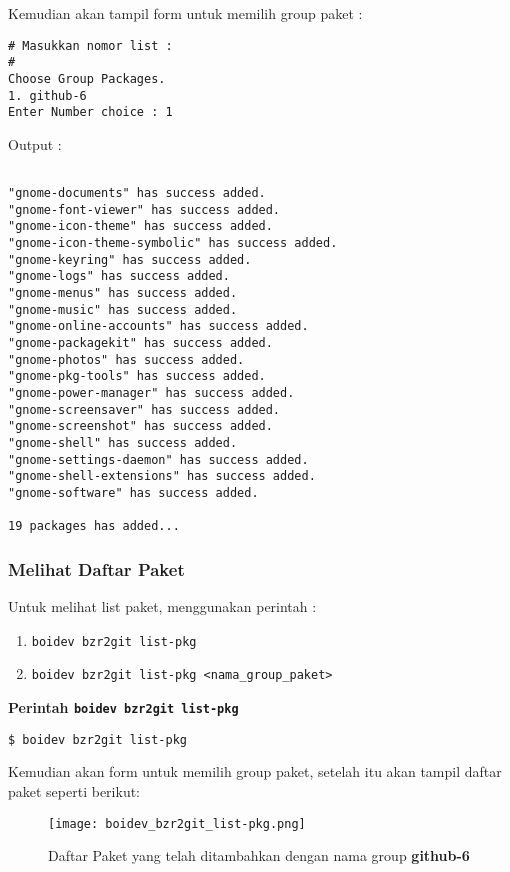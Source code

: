 {\noindent
Kemudian akan tampil form untuk memilih group paket :

\begin{lstlisting}[language=ShellBash]
# Masukkan nomor list :
#
Choose Group Packages.
1. github-6
Enter Number choice : 1
\end{lstlisting}

\noindent
Output :

\begin{lstlisting}[language=ShellBash]

"gnome-documents" has success added.
"gnome-font-viewer" has success added.
"gnome-icon-theme" has success added.
"gnome-icon-theme-symbolic" has success added.
"gnome-keyring" has success added.
"gnome-logs" has success added.
"gnome-menus" has success added.
"gnome-music" has success added.
"gnome-online-accounts" has success added.
"gnome-packagekit" has success added.
"gnome-photos" has success added.
"gnome-pkg-tools" has success added.
"gnome-power-manager" has success added.
"gnome-screensaver" has success added.
"gnome-screenshot" has success added.
"gnome-shell" has success added.
"gnome-settings-daemon" has success added.
"gnome-shell-extensions" has success added.
"gnome-software" has success added.

19 packages has added...

\end{lstlisting}

\subsubsection{Melihat Daftar Paket}
\noindent
Untuk melihat list paket, menggunakan perintah : 
\begin{enumerate}
	\item {\small \texttt{boidev bzr2git list-pkg}}
	\item {\small \texttt{boidev bzr2git list-pkg <nama\_group\_paket>}}
\end{enumerate}

\noindent
\textbf{Perintah {\small \texttt{boidev bzr2git list-pkg}}}

\begin{lstlisting}[language=ShellBash]
$ boidev bzr2git list-pkg
\end{lstlisting}

\noindent
Kemudian akan form untuk memilih group paket, setelah itu akan tampil daftar paket seperti berikut:

\begin{figure}[H]
	\centering
	\texttt{[image: boidev\_bzr2git\_list-pkg.png]}
	\caption{Daftar Paket yang telah ditambahkan dengan nama group \textbf{github-6}}
	\label{fig:bab2_list-pkg}
\end{figure}

}
